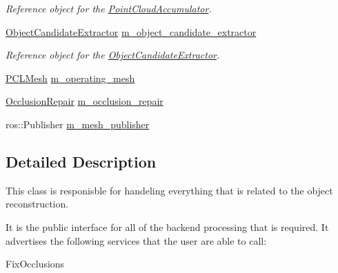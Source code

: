 \begin{DoxyCompactItemize}
\begin{DoxyCompactList}\small\item\em \-Reference object for the \hyperlink{class_point_cloud_accumulator}{\-Point\-Cloud\-Accumulator}. \end{DoxyCompactList}\item 
\hyperlink{class_object_candidate_extractor}{\-Object\-Candidate\-Extractor} \hyperlink{classobject__reconstruction__node_a5c9dce10dc493b97dff5f1aac13a7501}{m\-\_\-object\-\_\-candidate\-\_\-extractor}
\begin{DoxyCompactList}\small\item\em \-Reference object for the \hyperlink{class_object_candidate_extractor}{\-Object\-Candidate\-Extractor}. \end{DoxyCompactList}\item 
\hyperlink{_helper_functions_8h_a1ee4898d5040989c5fad6726ea5b2056}{\-P\-C\-L\-Mesh} \hyperlink{classobject__reconstruction__node_a4eb806cffef0fefce2d9b9959c7c78c0}{m\-\_\-operating\-\_\-mesh}
\item 
\hyperlink{class_occlusion_repair}{\-Occlusion\-Repair} \hyperlink{classobject__reconstruction__node_a7555f2606f0d98ad92aef4260346b016}{m\-\_\-occlusion\-\_\-repair}
\item 
ros\-::\-Publisher \hyperlink{classobject__reconstruction__node_a6a72f63b7f73aea0f7b6c9f7cb058c82}{m\-\_\-mesh\-\_\-publisher}
\end{DoxyCompactItemize}


\subsection{\-Detailed \-Description}
\-This class is responisble for handeling everything that is related to the object reconstruction. 

\-It is the public interface for all of the backend processing that is required. \-It advertises the following services that the user are able to call\-: 
\begin{DoxyItemize}
\item \-Fix\-Occlusions
\end{DoxyItemize}

